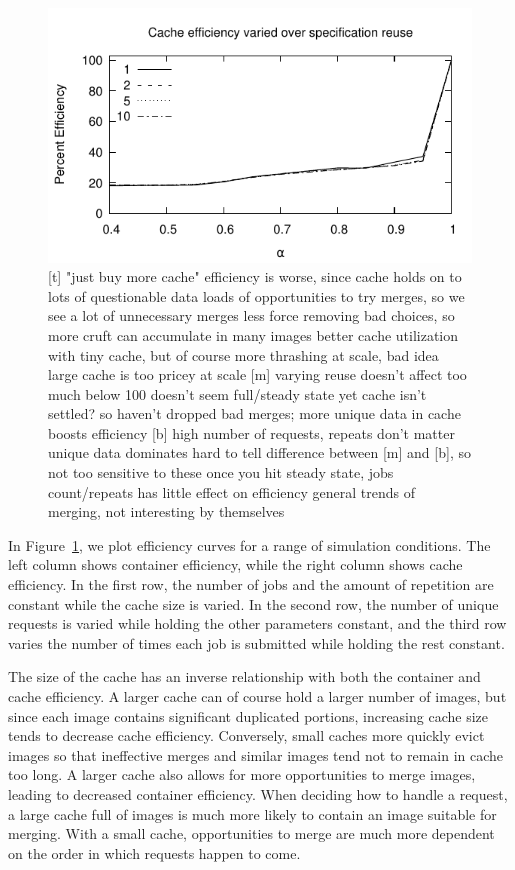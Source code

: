 \documentclass[sigconf]{acmart}
\begin{document}
\begin{figure}
\hfill
\includegraphics[width=0.48\linewidth]{curated/sensitivity/cache_efficiency_uses.pdf}
\label{fig:sensitivity}
[t] "just buy more cache"
efficiency is worse, since cache holds on to lots of questionable data
loads of opportunities to try merges, so we see a lot of unnecessary merges
less force removing bad choices, so more cruft can accumulate in many images
better cache utilization with tiny cache, but of course more thrashing
at scale, bad idea
large cache is too pricey at scale
[m] varying reuse doesn't affect too much
below 100 doesn't seem full/steady state yet
cache isn't settled? so haven't dropped bad merges; more unique data in cache boosts efficiency
[b] high number of requests, repeats don't matter
unique data dominates
hard to tell difference between [m] and [b], so not too sensitive to these
once you hit steady state, jobs count/repeats has little effect on efficiency
general trends of merging, not interesting by themselves
\fi
\end{figure}

In Figure~\ref{fig:sensitivity}, we plot efficiency curves for a range of simulation conditions.
The left column shows container efficiency,
while the right column shows cache efficiency.
In the first row, the number of jobs and the amount of repetition are constant while the cache size is varied.
In the second row, the number of unique requests is varied while holding the other parameters constant,
and the third row varies the number of times each job is submitted while holding the rest constant.

The size of the cache has an inverse relationship with both the container and cache efficiency.
A larger cache can of course hold a larger number of images,
but since each image contains significant duplicated portions,
increasing cache size tends to decrease cache efficiency.
Conversely, small caches more quickly evict images so that ineffective merges and similar images tend not to remain in cache too long.
A larger cache also allows for more opportunities to merge images,
leading to decreased container efficiency.
When deciding how to handle a request,
a large cache full of images is much more likely to contain an image suitable for merging.
With a small cache, opportunities to merge are much more dependent on the order in which requests happen to come.
\end{document}
